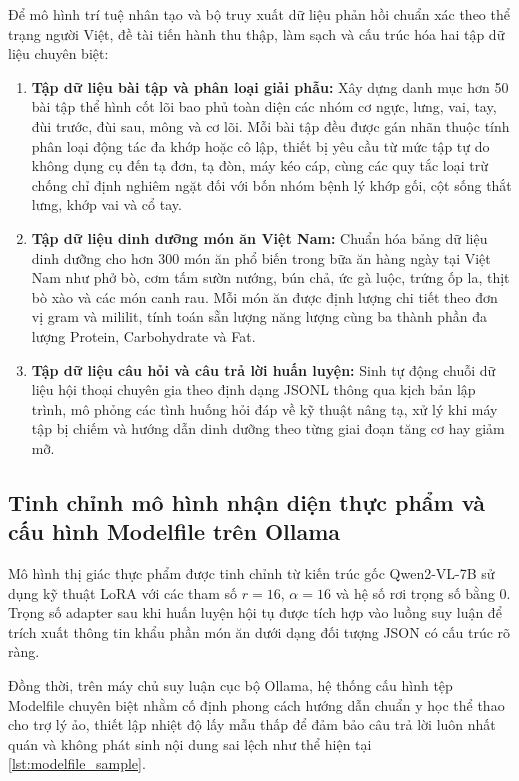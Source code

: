 Để mô hình trí tuệ nhân tạo và bộ truy xuất dữ liệu phản hồi chuẩn xác theo thể trạng người Việt, đề tài tiến hành thu thập, làm sạch và cấu trúc hóa hai tập dữ liệu chuyên biệt:
\begin{enumerate}[label=\arabic*)]
    \item \textbf{Tập dữ liệu bài tập và phân loại giải phẫu:} Xây dựng danh mục hơn 50 bài tập thể hình cốt lõi bao phủ toàn diện các nhóm cơ ngực, lưng, vai, tay, đùi trước, đùi sau, mông và cơ lõi. Mỗi bài tập đều được gán nhãn thuộc tính phân loại động tác đa khớp hoặc cô lập, thiết bị yêu cầu từ mức tập tự do không dụng cụ đến tạ đơn, tạ đòn, máy kéo cáp, cùng các quy tắc loại trừ chống chỉ định nghiêm ngặt đối với bốn nhóm bệnh lý khớp gối, cột sống thắt lưng, khớp vai và cổ tay.
    \item \textbf{Tập dữ liệu dinh dưỡng món ăn Việt Nam:} Chuẩn hóa bảng dữ liệu dinh dưỡng cho hơn 300 món ăn phổ biến trong bữa ăn hàng ngày tại Việt Nam như phở bò, cơm tấm sườn nướng, bún chả, ức gà luộc, trứng ốp la, thịt bò xào và các món canh rau. Mỗi món ăn được định lượng chi tiết theo đơn vị gram và mililit, tính toán sẵn lượng năng lượng cùng ba thành phần đa lượng Protein, Carbohydrate và Fat.
    \item \textbf{Tập dữ liệu câu hỏi và câu trả lời huấn luyện:} Sinh tự động chuỗi dữ liệu hội thoại chuyên gia theo định dạng JSONL thông qua kịch bản lập trình, mô phỏng các tình huống hỏi đáp về kỹ thuật nâng tạ, xử lý khi máy tập bị chiếm và hướng dẫn dinh dưỡng theo từng giai đoạn tăng cơ hay giảm mỡ.
\end{enumerate}

\subsection{Tinh chỉnh mô hình nhận diện thực phẩm và cấu hình Modelfile trên Ollama}
\label{subsec:finetune_ollama}

Mô hình thị giác thực phẩm được tinh chỉnh từ kiến trúc gốc Qwen2-VL-7B sử dụng kỹ thuật LoRA với các tham số $r = 16$, $\alpha = 16$ và hệ số rơi trọng số bằng 0. Trọng số adapter sau khi huấn luyện hội tụ được tích hợp vào luồng suy luận để trích xuất thông tin khẩu phần món ăn dưới dạng đối tượng JSON có cấu trúc rõ ràng.

Đồng thời, trên máy chủ suy luận cục bộ Ollama, hệ thống cấu hình tệp Modelfile chuyên biệt nhằm cố định phong cách hướng dẫn chuẩn y học thể thao cho trợ lý ảo, thiết lập nhiệt độ lấy mẫu thấp để đảm bảo câu trả lời luôn nhất quán và không phát sinh nội dung sai lệch như thể hiện tại \cref{lst:modelfile_sample}.

